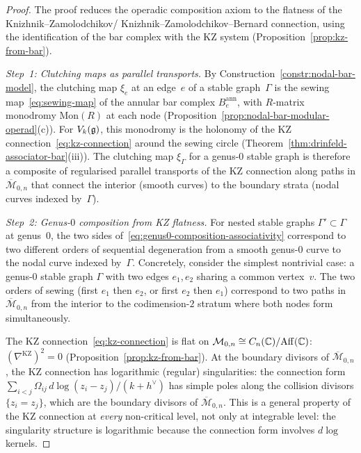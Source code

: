 \begin{proof}
The proof reduces the operadic composition axiom to the
flatness of the Knizhnik--Zamolodchikov\slash
Knizhnik--Zamolodchikov--Bernard connection, using the
identification of the bar complex with the KZ system
\textup{(}Proposition~\textup{\ref{prop:kz-from-bar}}\textup{)}.

\medskip\noindent
\emph{Step~1: Clutching maps as parallel transports.}
By Construction~\ref{constr:nodal-bar-model}, the clutching
map $\xi_e$ at an edge~$e$ of a stable graph~$\Gamma$ is
the sewing map~\eqref{eq:sewing-map} of the annular bar
complex $B^{\mathrm{ann}}_e$, with
$R$-matrix monodromy $\mathrm{Mon}(R)$ at each node
\textup{(}Proposition~\textup{\ref{prop:nodal-bar-modular-operad}(c)}\textup{)}.
For $V_k(\mathfrak{g})$, this monodromy is the holonomy of the KZ
connection~\eqref{eq:kz-connection} around the sewing circle
\textup{(}Theorem~\textup{\ref{thm:drinfeld-associator-bar}(iii)}\textup{)}.
The clutching map $\xi_\Gamma$ for a genus-$0$ stable graph
is therefore a composite of regularised parallel transports
of the KZ connection along paths in
$\overline{\mathcal{M}}_{0,n}$ that connect the interior
\textup{(}smooth curves\textup{)} to the boundary strata
\textup{(}nodal curves indexed by~$\Gamma$\textup{)}.

\medskip\noindent
\emph{Step~2: Genus-$0$ composition from KZ flatness.}
For nested stable graphs $\Gamma' \subset \Gamma$ at genus~$0$,
the two sides of~\eqref{eq:genus0-composition-associativity}
correspond to two different orders of sequential degeneration
from a smooth genus-$0$ curve to the nodal curve indexed
by~$\Gamma$.
Concretely, consider the simplest nontrivial case: a genus-$0$
stable graph $\Gamma$ with two edges $e_1, e_2$ sharing a
common vertex~$v$. The two orders of sewing (first $e_1$
then $e_2$, or first $e_2$ then $e_1$) correspond to two
paths in $\overline{\mathcal{M}}_{0,n}$ from the interior to
the codimension-$2$ stratum where both nodes form
simultaneously.

The KZ connection~\eqref{eq:kz-connection} is flat on
$\mathcal{M}_{0,n} \cong C_n(\mathbb{C})/\mathrm{Aff}(\mathbb{C})$:
$(\nabla^{\mathrm{KZ}})^2 = 0$
\textup{(}Proposition~\textup{\ref{prop:kz-from-bar}}\textup{)}.
At the boundary divisors of $\overline{\mathcal{M}}_{0,n}$,
the KZ connection has logarithmic
\textup{(}regular\textup{)} singularities: the connection form
$\sum_{i<j} \Omega_{ij}\, d\log(z_i - z_j)/(k+h^\vee)$ has
simple poles along the collision divisors $\{z_i = z_j\}$,
which are the boundary divisors of
$\overline{\mathcal{M}}_{0,n}$. This is a general property
of the KZ connection at \emph{every} non-critical level, not
only at integrable level: the singularity structure is
logarithmic because the connection form involves $d\log$
kernels.


\end{proof}
